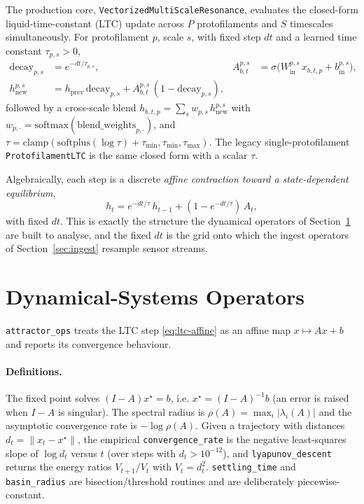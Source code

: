 \documentclass[11pt]{article}
\theoremstyle{definition}
\newcommand{\norm}[1]{\left\lVert #1 \right\rVert}
\newcommand{\code}[1]{\texttt{#1}}
\begin{document}
The production core, \code{VectorizedMultiScaleResonance}, evaluates the
closed-form liquid-time-constant (LTC) update across $P$ protofilaments and
$S$ timescales simultaneously. For protofilament $p$, scale $s$, with fixed
step $dt$ and a learned time constant $\tau_{p,s}>0$,
\begin{align}
\text{decay}_{p,s} &= e^{-dt/\tau_{p,s}}, &
A^{p,s}_{b,t} &= \sigma\!\big(W^{p,s}_{\text{in}}\,x_{b,t,p} + b^{p,s}_{\text{in}}\big),\\
h^{p,s}_{\text{new}} &= h_{\text{prev}}\,\text{decay}_{p,s}
   + A^{p,s}_{b,t}\,(1-\text{decay}_{p,s}),
\end{align}
followed by a cross-scale blend $h_{b,t,p} = \sum_s w_{p,s}\,h^{p,s}_{\text{new}}$
with $w_{p,\cdot} = \mathrm{softmax}(\text{blend\_weights}_{p,\cdot})$, and
$\tau = \mathrm{clamp}(\mathrm{softplus}(\log\tau)+\tau_{\min}, \tau_{\min}, \tau_{\max})$.
The legacy single-protofilament \code{ProtofilamentLTC} is the same closed
form with a scalar $\tau$.

Algebraically, each step is a discrete \emph{affine contraction toward a
state-dependent equilibrium},
\begin{equation}\label{eq:ltc-affine}
h_t = e^{-dt/\tau}\,h_{t-1} + (1-e^{-dt/\tau})\,A_t,
\end{equation}
with fixed $dt$. This is exactly the structure the dynamical operators of
Section~\ref{sec:attractor} are built to analyse, and the fixed $dt$ is the
grid onto which the ingest operators of Section~\ref{sec:ingest} resample
sensor streams.

\section{Dynamical-Systems Operators}\label{sec:attractor}
\code{attractor\_ops} treats the LTC step \eqref{eq:ltc-affine} as an affine
map $x\mapsto Ax+b$ and reports its convergence behaviour.

\paragraph{Definitions.}
The fixed point solves $(I-A)x^\star=b$, i.e.
$x^\star=(I-A)^{-1}b$ (an error is raised when $I-A$ is singular). The
spectral radius is $\rho(A)=\max_i|\lambda_i(A)|$ and the asymptotic
convergence rate is $-\log\rho(A)$. Given a trajectory with distances
$d_t=\norm{x_t-x^\star}$, the empirical \code{convergence\_rate} is the
negative least-squares slope of $\log d_t$ versus $t$ (over steps with
$d_t>10^{-12}$), and \code{lyapunov\_descent} returns the energy ratios
$V_{t+1}/V_t$ with $V_t=d_t^2$. \code{settling\_time} and \code{basin\_radius}
are bisection/threshold routines and are deliberately piecewise-constant.
\end{document}

